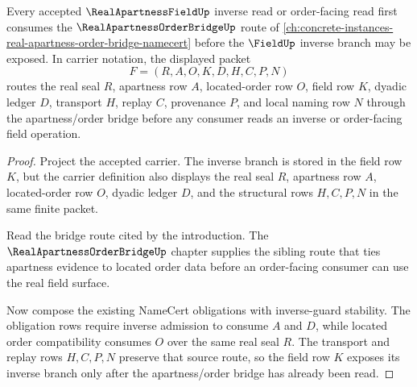 \begin{theorem}
\label{thm:real-apartness-field-located-source-route}
Every accepted $\RealApartnessFieldUp$ inverse read or order-facing read first consumes the $\RealApartnessOrderBridgeUp$ route of \autoref{ch:concrete-instances-real-apartness-order-bridge-namecert} before the $\FieldUp$ inverse branch may be exposed. In carrier notation, the displayed packet
$$
F=(R,A,O,K,D,H,C,P,N)
$$
routes the real seal $R$, apartness row $A$, located-order row $O$, field row $K$, dyadic ledger $D$, transport $H$, replay $C$, provenance $P$, and local naming row $N$ through the apartness/order bridge before any consumer reads an inverse or order-facing field operation.
\end{theorem}
\begin{proof}
Project the accepted carrier. The inverse branch is stored in the field row $K$, but the carrier definition also displays the real seal $R$, apartness row $A$, located-order row $O$, dyadic ledger $D$, and the structural rows $H,C,P,N$ in the same finite packet.

Read the bridge route cited by the introduction. The $\RealApartnessOrderBridgeUp$ chapter supplies the sibling route that ties apartness evidence to located order data before an order-facing consumer can use the real field surface.

Now compose the existing NameCert obligations with inverse-guard stability. The obligation rows require inverse admission to consume $A$ and $D$, while located order compatibility consumes $O$ over the same real seal $R$. The transport and replay rows $H,C,P,N$ preserve that source route, so the field row $K$ exposes its inverse branch only after the apartness/order bridge has already been read.
\end{proof}

